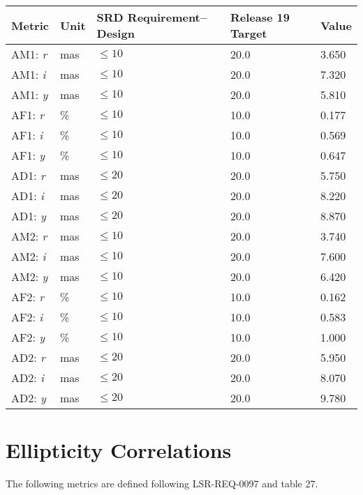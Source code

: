 \documentclass[DM,lsstdraft,toc]{lsstdoc}
\begin{document}
\begin{longtable}{L{0.19\columnwidth}L{0.08\columnwidth}L{0.2\columnwidth}R{0.22\columnwidth}R{0.17\columnwidth}}
\toprule
Metric &
Unit &
SRD Requirement--Design &
Release 19 Target &
Value
\tabularnewline
\midrule
\endhead
AM1: \emph{r} &
mas &
\(\leq 10\) &
20.0 &
3.650
\tabularnewline
AM1: \emph{i} &
mas &
\(\leq 10\) &
20.0 &
7.320
\tabularnewline
AM1: \emph{y} &
mas &
\(\leq 10\) &
20.0 &
5.810
\tabularnewline
AF1: \emph{r} &
\% &
\(\leq 10\) &
10.0 &
0.177
\tabularnewline
AF1: \emph{i} &
\% &
\(\leq 10\) &
10.0 &
0.569
\tabularnewline
AF1: \emph{y} &
\% &
\(\leq 10\) &
10.0 &
0.647
\tabularnewline
AD1: \emph{r} &
mas &
\(\leq 20\) &
20.0 &
5.750
\tabularnewline
AD1: \emph{i} &
mas &
\(\leq 20\) &
20.0 &
8.220
\tabularnewline
AD1: \emph{y} &
mas &
\(\leq 20\) &
20.0 &
8.870
\tabularnewline
AM2: \emph{r} &
mas &
\(\leq 10\) &
20.0 &
3.740
\tabularnewline
AM2: \emph{i} &
mas &
\(\leq 10\) &
20.0 &
7.600
\tabularnewline
AM2: \emph{y} &
mas &
\(\leq 10\) &
20.0 &
6.420
\tabularnewline
AF2: \emph{r} &
\% &
\(\leq 10\) &
10.0 &
0.162
\tabularnewline
AF2: \emph{i} &
\% &
\(\leq 10\) &
10.0 &
0.583
\tabularnewline
AF2: \emph{y} &
\% &
\(\leq 10\) &
10.0 &
1.000
\tabularnewline
AD2: \emph{r} &
mas &
\(\leq 20\) &
20.0 &
5.950
\tabularnewline
AD2: \emph{i} &
mas &
\(\leq 20\) &
20.0 &
8.070
\tabularnewline
AD2: \emph{y} &
mas &
\(\leq 20\) &
20.0 &
9.780
\tabularnewline
\bottomrule
\end{longtable}

\section{Ellipticity Correlations}\label{ellipticity-correlations}


The following metrics are defined following LSR-REQ-0097
 and  table 27.
\end{document}
